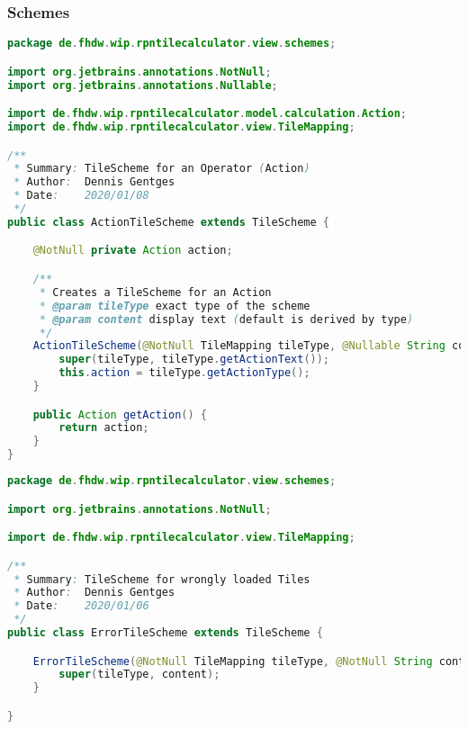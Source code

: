 \subsubsection{Schemes}

\begin{lstlisting}[caption=ActionTileScheme,label=list:ActionTileScheme,language=Java]
package de.fhdw.wip.rpntilecalculator.view.schemes;

import org.jetbrains.annotations.NotNull;
import org.jetbrains.annotations.Nullable;

import de.fhdw.wip.rpntilecalculator.model.calculation.Action;
import de.fhdw.wip.rpntilecalculator.view.TileMapping;

/**
 * Summary: TileScheme for an Operator (Action)
 * Author:  Dennis Gentges
 * Date:    2020/01/08
 */
public class ActionTileScheme extends TileScheme {

    @NotNull private Action action;

    /**
     * Creates a TileScheme for an Action
     * @param tileType exact type of the scheme
     * @param content display text (default is derived by type)
     */
    ActionTileScheme(@NotNull TileMapping tileType, @Nullable String content) {
        super(tileType, tileType.getActionText());
        this.action = tileType.getActionType();
    }

    public Action getAction() {
        return action;
    }
}
\end{lstlisting}    

\begin{lstlisting}[caption=ErrorTileScheme,label=list:ErrorTileScheme,language=Java]
package de.fhdw.wip.rpntilecalculator.view.schemes;

import org.jetbrains.annotations.NotNull;

import de.fhdw.wip.rpntilecalculator.view.TileMapping;

/**
 * Summary: TileScheme for wrongly loaded Tiles
 * Author:  Dennis Gentges
 * Date:    2020/01/06
 */
public class ErrorTileScheme extends TileScheme {

    ErrorTileScheme(@NotNull TileMapping tileType, @NotNull String content) {
        super(tileType, content);
    }

}
\end{lstlisting}    

